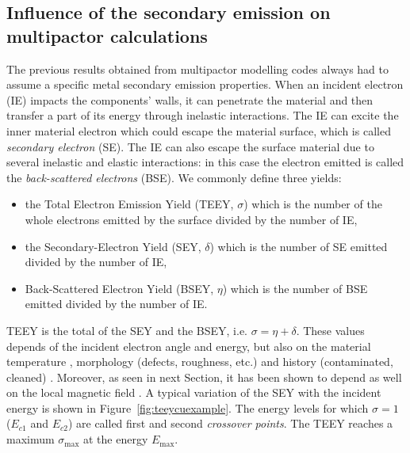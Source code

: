\subsection[Influence of Electron Emission]{Influence of the secondary emission on multipactor calculations}\label{sec:multipactor_TEEY}
The previous results obtained from multipactor modelling codes always had to assume a specific metal secondary emission properties. When an incident electron (IE) impacts the components' walls, it can penetrate the material and then transfer a part of its energy through inelastic interactions. The IE can excite the inner material electron which could escape the material surface, which is called \textit{secondary electron} (SE). The IE can also escape the surface material due to several inelastic and elastic interactions: in this case the electron emitted is called the \textit{back-scattered electrons} (BSE). We commonly define three yields: 
\begin{itemize}
	\item the Total Electron Emission Yield (TEEY, $\sigma$) which is the number of the whole electrons emitted by the surface divided by the number of IE,
	\item the Secondary-Electron Yield (SEY, $\delta$) which is the number of SE emitted divided by the number of IE,
	\item Back-Scattered Electron Yield (BSEY, $\eta$) which is the
	number of BSE emitted divided by the number of IE. 
\end{itemize}
TEEY is the total of the SEY and the BSEY, i.e. $\sigma=\eta+\delta$. These values depends of the incident electron angle and energy, but also on the material temperature , morphology (defects, roughness, etc.)  and history (contaminated, cleaned) . Moreover, as seen in next Section, it has been shown to depend as well on the local magnetic field . A  typical variation of the SEY with the incident energy is shown in Figure~\ref{fig:teeycuexample}. The energy levels for which $\sigma=1$ ($E_{c1}$ and $E_{c2}$) are called first and second \textit{crossover points}. The TEEY reaches a maximum $\sigma_{\max}$ at the energy $E_{\max}$. 

